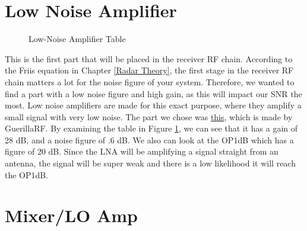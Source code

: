 \section{Low Noise Amplifier}
\begin{figure}[H]
  \centering
  \caption{Low-Noise Amplifier Table}
  \label{img:lnatable}
\end{figure}

This is the first part that will be placed in the receiver RF chain. According to the Friis equation in Chapter \ref{Radar Theory},
the first stage in the receiver RF chain matters a lot for the noise figure of your system. Therefore, we wanted to find a part
with a low noise figure and high gain, as this will impact our SNR the most. Low noise amplifiers are made for this exact purpose,
where they amplify a small signal with very low noise. The part we chose was \href{https://www.mouser.com/ProductDetail/Guerrilla-RF/GRF2133W?qs=ulEaXIWI0c%2FXgAPwqRmr2A%3D%3D}{this},
which is made by GuerillaRF. By examining the table in Figure \ref{img:lnatable}, we can see that it has a gain of 28 dB,
and a noise figure of .6 dB. We also can look at the OP1dB which has a figure of 20 dB. Since the LNA will be amplifying a signal
straight from an antenna, the signal will be super weak and there is a low likelihood it will reach the OP1dB.

\section{Mixer/LO Amp}